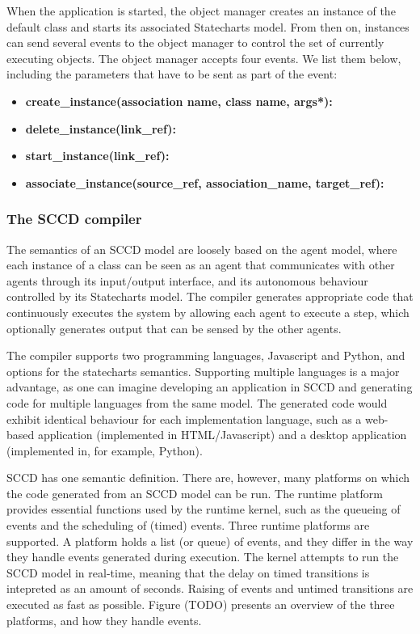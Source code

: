 When the application is started, the object manager creates an instance of the default class and starts its associated Statecharts 
model. From then on, instances can send several events to the object manager to control the set of currently executing objects. 
The object manager accepts four events. We list them below, including the parameters that have to be sent as part of the event:
\begin{itemize}
    \item \textbf{create\_instance(association name, class name, args*):}
    \item \textbf{delete\_instance(link\_ref):}
    \item \textbf{start\_instance(link\_ref):}
    \item \textbf{associate\_instance(source\_ref, association\_name, target\_ref):}
\end{itemize}


\subsubsection{The SCCD compiler}
The semantics of an SCCD model are loosely based on the agent model, where each instance of a class can be seen as an agent that 
communicates with other agents through its input/output interface, and its autonomous behaviour controlled by its Statecharts 
model. The compiler generates appropriate code that continuously executes the system by allowing each agent to execute a step, 
which optionally generates output that can be sensed by the other agents.

The compiler supports two programming languages, Javascript and Python, and options for the statecharts semantics. Supporting 
multiple languages is a major advantage, as one can imagine developing an application in SCCD and generating code for multiple 
languages from the same model. The generated code would exhibit identical behaviour for each implementation language, such as a 
web-based application (implemented in HTML/Javascript) and a desktop application (implemented in, for example, Python).

SCCD has one semantic definition. There are, however, many platforms on which the code generated from an SCCD model can be run. 
The runtime platform provides essential functions used by the runtime kernel, such as the queueing of events and the scheduling 
of (timed) events. Three runtime platforms are supported. A platform holds a list (or queue) of events, and they differ in the 
way they handle events generated during execution. The kernel attempts to run the SCCD model in real-time, meaning that the delay 
on timed transitions is intepreted as an amount of seconds. Raising of events and untimed transitions are executed as fast as 
possible. Figure (TODO) presents an overview of the three platforms, and how they handle events.

